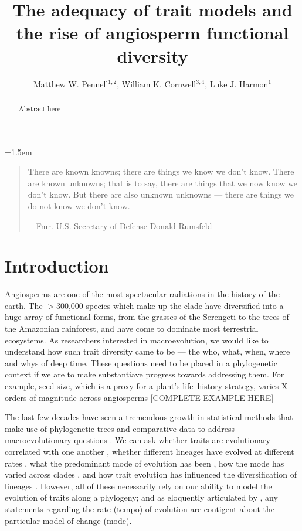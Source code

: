 \documentclass[12pt]{article}
\title{The adequacy of trait models and the rise of angiosperm functional diversity}
\author{
Matthew W. Pennell$^{1,2}$, William K. Cornwell$^{3,4}$, Luke J. Harmon$^{1}$
}
\date{}
\affiliation{\noindent
$^{1}$ Department of Biological Sciences and Institute for Bioinformatics and Evolutionary Studies, University of Idaho, Moscow, ID 83844, U.S.A.\\
$^{2}$ \texttt{mwpennell@gmail.com}\\
$^{3}$ VU University\\
$^{4}$ University of NSW
}
\begin{document}
\mstitlepage
\parindent=1.5em
\addtolength{\parskip}{.3em}

\begin{abstract}
Abstract here
\end{abstract}

\vfill

\newpage


\begin{quotation}
\noindent There are known knowns; there are things we know we don't know. There are known unknowns; that is to say, there are things that we now know we don't know. But there are also unknown unknowns --- there are things we do not know we don't know. 

---Fmr. U.S. Secretary of Defense Donald Rumsfeld
\end{quotation}

\section{Introduction}
Angiosperms are one of the most spectacular radiations in the history of the earth. The $>$300,000 species which make up the clade have diversified into a huge array of functional forms, from the grasses of the Serengeti to the trees of the Amazonian rainforest, and have come to dominate most terrestrial ecosystems. As researchers interested in macroevolution, we would like to understand how such trait diversity came to be --- the who, what, when, where and whys of deep time. These questions need to be placed in a phylogenetic context if we are to make substantiave progress towards addressing them. For example, seed size, which is a proxy for a plant's life--history strategy, varies X orders of magnitude across angiosperms \citep{Westoby1992TREE, Lord1995AmNat, Westoby2002, Moles2005, Cornwell2013} [COMPLETE EXAMPLE HERE]

The last few decades have seen a tremendous growth in statistical methods that make use of phylogenetic trees and comparative data to address macroevolutionary questions \citep[for a recent review see][]{PennellHarmon}. We can ask whether traits are evolutionary correlated with one another \citep[e.g.][]{Felsenstein1985, Grafen1989}, whether different lineages have evolved at different rates \citep[e.g.][]{Omeara2006, Eastman2011}, what the predominant mode of evolution has been \citep[e.g.][]{HansenMartins1996, Mooers1999, Harmon2010}, how the mode has varied across clades \citep[e.g.][]{ButlerKing2004, Beaulieu2012}, and how trait evolution has influenced the diversification of lineages \citep[e.g.][]{Maddison2007, FitzJohn2010}. However, all of these necessarily rely on our ability to model the evolution of traits along a phylogeny; and as eloquently articulated by \citet{Hunt2012}, any statements regarding the rate (tempo) of evolution are contigent about the particular model of change (mode).
\end{document}
